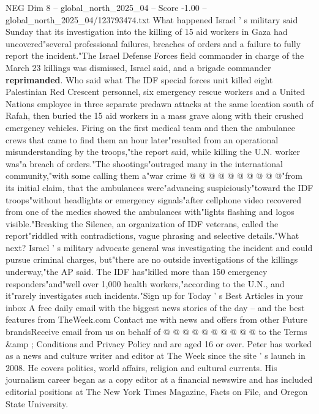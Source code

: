 \begin{textsample}{NEG Dim 8 – global\_north\_2025\_04 – Score -1.00 – global\_north\_2025\_04/123793474.txt}  \label{ex:f8_neg_422}
What happened Israel ' s military said Sunday that its investigation into the killing of 15 aid workers in Gaza had uncovered"several professional failures, breaches of orders and a failure to fully report the incident."The Israel Defense Forces field commander in charge of the March 23 killings was dismissed, Israel said, and a brigade commander \textbf{reprimanded}.
Who said what The IDF special forces unit killed eight Palestinian Red Crescent personnel, six emergency rescue workers and a United Nations employee in three separate predawn attacks at the same location south of Rafah, then buried the 15 aid workers in a mass grave along with their crushed emergency vehicles.
Firing on the first medical team and then the ambulance crews that came to find them an hour later"resulted from an operational misunderstanding by the troops,"the report said, while killing the U.N. worker was"a breach of orders."The shootings"outraged many in the international community,"with some calling them a"war crime @ @ @ @ @ @ @ @ @ @"from its initial claim, that the ambulances were"advancing suspiciously"toward the IDF troops"without headlights or emergency signals"after cellphone video recovered from one of the medics showed the ambulances with"lights flashing and logos visible."Breaking the Silence, an organization of IDF veterans, called the report"riddled with contradictions, vague phrasing and selective details."What next?
Israel ' s military advocate general was investigating the incident and could pursue criminal charges, but"there are no outside investigations of the killings underway,"the AP said.
The IDF has"killed more than 150 emergency responders"and"well over 1,000 health workers,"according to the U.N., and it"rarely investigates such incidents."Sign up for Today ' s Best Articles in your inbox A free daily email with the biggest news stories of the day -- and the best features from TheWeek.com Contact me with news and offers from other Future brandsReceive email from us on behalf of @ @ @ @ @ @ @ @ @ @ to the Terms \&amp ; Conditions and Privacy Policy and are aged 16 or over.
Peter has worked as a news and culture writer and editor at The Week since the site ' s launch in 2008.
He covers politics, world affairs, religion and cultural currents.
His journalism career began as a copy editor at a financial newswire and has included editorial positions at The New York Times Magazine, Facts on File, and Oregon State University.

\end{textsample}
